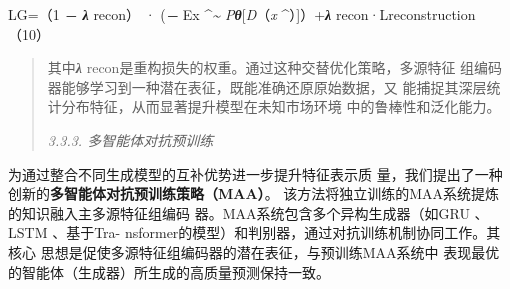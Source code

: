 \documentclass[UTF8]{ctexart}
\begin{document}
LG=（1 \emph{\textbf{− λ}} recon） · (\emph{\textbf{−}} Ex
\textbf{\^{}}\emph{\textasciitilde{} P\textbf{θ}}{[}\emph{D}（\emph{x}
\textbf{\^{}}）{]}）+\emph{\textbf{λ}} recon·Lreconstruction （10）

\begin{quote}
其中\emph{\textbf{λ}}
recon是重构损失的权重。通过这种交替优化策略，多源特征
组编码器能够学习到一种潜在表征，既能准确还原原始数据，又
能捕捉其深层统计分布特征，从而显著提升模型在未知市场环境
中的鲁棒性和泛化能力。

\emph{3.3.3. 多智能体对抗预训练}
\end{quote}

为通过整合不同生成模型的互补优势进一步提升特征表示质
量，我们提出了一种创新的\textbf{多智能体对抗预训练策略（MAA）}。
该方法将独立训练的MAA系统提炼的知识融入主多源特征组编码
器。MAA系统包含多个异构生成器（如GRU 、 LSTM 、基于Tra-
nsformer的模型）和判别器，通过对抗训练机制协同工作。其核心
思想是促使多源特征组编码器的潜在表征，与预训练MAA系统中
表现最优的智能体（生成器）所生成的高质量预测保持一致。
\end{document}
